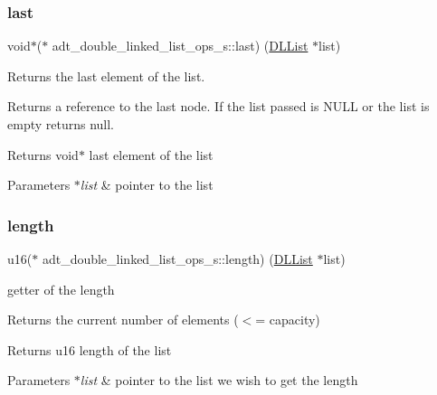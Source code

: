 \subsubsection{\texorpdfstring{last}{last}}
{\footnotesize\ttfamily void$\ast$($\ast$ adt\+\_\+double\+\_\+linked\+\_\+list\+\_\+ops\+\_\+s\+::last) (\hyperlink{structadt__double__linked__list__s}{D\+L\+List} $\ast$list)}



Returns the last element of the list. 

Returns a reference to the last node. If the list passed is N\+U\+LL or the list is empty returns null.

\begin{DoxyReturn}{Returns}
void$\ast$ last element of the list 
\end{DoxyReturn}

\begin{DoxyParams}{Parameters}
{\em $\ast$list} & pointer to the list \\
\hline
\end{DoxyParams}
\mbox{\label{structadt__double__linked__list__ops__s_a65de6dc4c9fafded567468218e387155}} 
\subsubsection{\texorpdfstring{length}{length}}
{\footnotesize\ttfamily u16($\ast$ adt\+\_\+double\+\_\+linked\+\_\+list\+\_\+ops\+\_\+s\+::length) (\hyperlink{structadt__double__linked__list__s}{D\+L\+List} $\ast$list)}



getter of the length 

Returns the current number of elements ($<$= capacity)

\begin{DoxyReturn}{Returns}
u16 length of the list 
\end{DoxyReturn}

\begin{DoxyParams}{Parameters}
{\em $\ast$list} & pointer to the list we wish to get the length \\
\hline
\end{DoxyParams}
\mbox{\label{structadt__double__linked__list__ops__s_aa20365d81a3b2dc4642f8c3863a40357}} 
